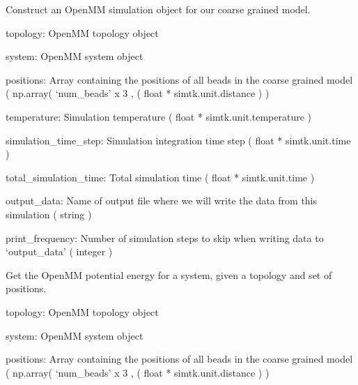 \documentclass[letterpaper,12pt,english,openany,oneside]{sphinxmanual}
\begin{document}
\begin{fulllineitems}
\label{\detokenize{simulation:simulation.tools.build_mm_simulation}}
Construct an OpenMM simulation object for our coarse grained model.

topology: OpenMM topology object

system: OpenMM system object

positions: Array containing the positions of all beads
in the coarse grained model
( np.array( ‘num\_beads’ x 3 , ( float * simtk.unit.distance ) )

temperature: Simulation temperature ( float * simtk.unit.temperature )

simulation\_time\_step: Simulation integration time step
( float * simtk.unit.time )

total\_simulation\_time: Total simulation time ( float * simtk.unit.time )

output\_data: Name of output file where we will write the data from this
simulation ( string )

print\_frequency: Number of simulation steps to skip when writing data
to ‘output\_data’ ( integer )

\end{fulllineitems}


\begin{fulllineitems}
\label{\detokenize{simulation:simulation.tools.get_mm_energy}}
Get the OpenMM potential energy for a system, given a topology and set of positions.

topology: OpenMM topology object

system: OpenMM system object

positions: Array containing the positions of all beads
in the coarse grained model
( np.array( ‘num\_beads’ x 3 , ( float * simtk.unit.distance ) )

\end{fulllineitems}
\end{document}
